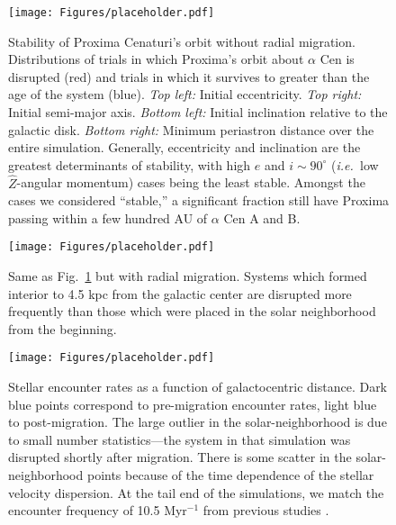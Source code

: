 \documentclass[preprint,12pt]{aastex}
\def\ie{{\it i.e.\ }}
\begin{document}
\begin{figure}
\texttt{[image: Figures/placeholder.pdf]}
\caption{Stability of Proxima Cenaturi's orbit without radial
  migration. Distributions of trials in which Proxima's orbit about
  $\alpha$ Cen is disrupted (red) and trials in which it survives to
  greater than the age of the system (blue). {\it Top left:} Initial
  eccentricity. {\it Top right:} Initial semi-major axis. {\it Bottom
    left:} Initial inclination relative to the galactic disk. {\it
    Bottom right:} Minimum periastron distance over the entire
  simulation. Generally, eccentricity and inclination are the greatest
  determinants of stability, with high $e$ and $i \sim 90^{\circ}$
  (\ie low $\hat{Z}$-angular momentum) cases being the least stable.
  Amongst the cases we considered ``stable,'' a significant fraction
  still have Proxima passing within a few hundred AU of $\alpha$ Cen A
  and B.}
\label{fig:galacdist}
\end{figure}

\begin{figure}
\texttt{[image: Figures/placeholder.pdf]}
\caption{Same as Fig.~\ref{fig:galacdist} but with radial migration.
  Systems which formed interior to 4.5 kpc from the galactic center
  are disrupted more frequently than
  those which were placed in the solar neighborhood from the
  beginning. }
\label{fig:galacdistmigr}
\end{figure}

\begin{figure}
\centering
\texttt{[image: Figures/placeholder.pdf]}
\caption{Stellar encounter rates as a function of galactocentric distance.
  Dark blue points correspond to pre-migration encounter rates, light 
  blue to post-migration. The large outlier in the 
  solar-neighborhood is due to small number statistics---the system 
  in that simulation was disrupted shortly after migration. There is some 
  scatter in the solar-neighborhood points because of the time dependence 
  of the stellar velocity dispersion. At the tail end of the simulations, we 
  match the encounter frequency of 10.5 Myr$^{-1}$ from previous 
  studies \citep{Garciasanchez2001,Rickman2008}.}
\label{fig:encrates}
\end{figure}

\end{document}
